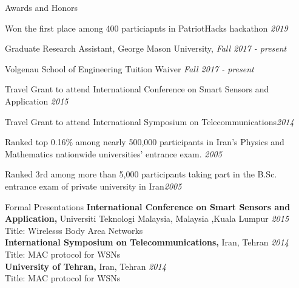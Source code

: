 \documentclass{resume} %
\begin{document}
\begin{rSection}{Awards and Honors} 
\item Won the first place among 400 particiapnts in PatriotHacks hackathon \hfill {\em  2019}
\item Graduate Research Assistant, George Mason University, \hfill {\em  Fall 2017 - present}
\item Volgenau School of Engineering Tuition Waiver  \hfill {\em  Fall 2017 - present}
\item Travel Grant to attend International Conference on Smart Sensors and Application \hfill {\em  2015}
\item Travel Grant to attend International Symposium on Telecommunications\hfill {\em  2014}
\item Ranked top 0.16\% among nearly 500,000 participants in Iran’s Physics and Mathematics nationwide universities’ entrance exam. \hfill {\em  2005}
\item Ranked 3rd among more than 5,000 participants taking part in the B.Sc. entrance exam of private university in Iran\hfill {\em  2005} 
\end{rSection}
\begin{rSection}{Formal Presentations}
{\bf International Conference on Smart Sensors and Application,}{ Universiti Teknologi Malaysia, Malaysia ,Kuala Lumpur} \hfill {\em 2015} 
\\ Title: Wirelesss Body Area Networks\\

{\bf International Symposium on Telecommunications,}{ Iran, Tehran} \hfill {\em 2014} 
\\ Title: MAC protocol for WSNs\\

{\bf University of Tehran,}{ Iran, Tehran} \hfill {\em 2014} 
\\ Title: MAC protocol for WSNs\\

\end{rSection}
\end{document}
